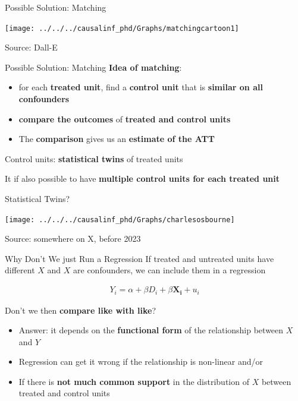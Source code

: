 \documentclass[
  ignorenonframetext,
  aspectratio=169, handout]{beamer}
\providecommand{\tightlist}{%
  \setlength{\itemsep}{0pt}\setlength{\parskip}{0pt}}
\newcommand{\brf}[1]{\textcolor{brickred}{\textbf{#1}}}
\begin{document}
\begin{frame}{Possible Solution: Matching}
\protect\hypertarget{possible-solution-matching}{}
\begin{center}\texttt{[image: ../../../causalinf\_phd/Graphs/matchingcartoon1]} \end{center}

\tiny

Source: Dall-E
\end{frame}

\begin{frame}{Possible Solution: Matching}
\protect\hypertarget{possible-solution-matching-1}{}
\brf{Idea of matching}:

\begin{itemize}
\tightlist
\item
  for each \textbf{treated unit}, find a \textbf{control unit} that is
  \textbf{similar on all confounders}
\item
  \textbf{compare the outcomes} of \textbf{treated and control units}
\item
  The \textbf{comparison} gives us an \textbf{estimate of the ATT}
\end{itemize}

\vfill

Control units: \brf{statistical twins} of treated units

\vfill

It if also possible to have
\brf{multiple control units for each treated unit}
\end{frame}

\begin{frame}{Statistical Twins?}
\protect\hypertarget{statistical-twins}{}
\begin{center}\texttt{[image: ../../../causalinf\_phd/Graphs/charlesosbourne]} \end{center}

\tiny

Source: somewhere on X, before 2023
\end{frame}

\begin{frame}{Why Don't We just Run a Regression}
\protect\hypertarget{why-dont-we-just-run-a-regression}{}
If treated and untreated units have different \(X\) and \(X\) are
confounders, we can include them in a regression

\begin{align*}
Y_i = \alpha + \beta D_i + \beta \boldsymbol{X_i} + u_i  
\end{align*}

\vfill

Don't we then \brf{compare like with like}?

\begin{itemize}
\tightlist
\item
  Answer: it depends on the \textbf{functional form} of the relationship
  between \(X\) and \(Y\)
\item
  Regression can get it wrong if the relationship is non-linear and/or
\item
  If there is \textbf{not much common support} in the distribution of
  \(X\) between treated and control units
\end{itemize}
\end{frame}
\end{document}
